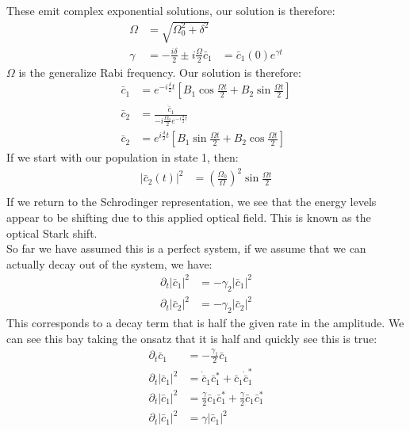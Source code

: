 These emit complex exponential solutions, our solution is therefore:
\begin{align*}
	\Omega &= \sqrt{\Omega_0^2 + \delta^2} \\
	\gamma &= -\frac{i\delta}{2} \pm i\frac{\Omega}{2}
	\bar{c}_1 &= \bar{c}_1(0) e^{\gamma t}
\end{align*}
$\Omega$ is the generalize Rabi frequency. Our solution is therefore:
\begin{align*}
	\bar{c}_1 &= e^{-i\frac{\delta}{2} t} \left[ B_1 \cos \frac{\Omega t}{2} + B_2 \sin \frac{\Omega t}{2}\right] \\
	\bar{c}_2 &= \frac{\dot{\bar{c}}_1}{-i\frac{\Omega_0}{2} e^{-i\frac{\delta}{2} t}} \\
	\bar{c}_2 &= e^{i\frac{\delta}{2} t} \left[ B_1 \sin \frac{\Omega t}{2} + B_2 \cos \frac{\Omega t}{2}\right]
\end{align*}
If we start with our population in state 1, then:
\begin{align*}
	|\bar{c}_2(t)|^2 &= \left(\frac{\Omega_0}{\Omega}\right)^2 \sin \frac{\Omega t}{2} \\
\end{align*}
If we return to the Schrodinger representation, we see that the energy levels appear to be shifting due to this applied optical field. This is known as the optical Stark shift.\\
So far we have assumed this is a perfect system, if we assume that we can actually decay out of the system, we have:
\begin{align*}
	\partial_t |\bar{c}_1|^2 &= -\gamma_2|\bar{c}_1|^2 \\
	\partial_t |\bar{c}_2|^2 &= -\gamma_2|\bar{c}_2|^2
\end{align*}
This corresponds to a decay term that is half the given rate in the amplitude. We can see this bay taking the onsatz that it is half and quickly see this is true:
\begin{align*}
	\partial_t \bar{c}_1 &= -\frac{\gamma_1}{2} \bar{c}_1 \\
	\partial_t |\bar{c}_1|^2 &= \dot{\bar{c}}_1\bar{c}_1^* + \bar{c}_1 \dot{\bar{c}}_1^* \\
	\partial_t |\bar{c}_1|^2 &= \frac{\gamma}{2}\bar{c}_1\bar{c}_1^* + \frac{\gamma}{2}\bar{c}_1 \bar{c}_1^* \\
	\partial_t |\bar{c}_1|^2 &= \gamma |\bar{c}_1|^2
\end{align*}
